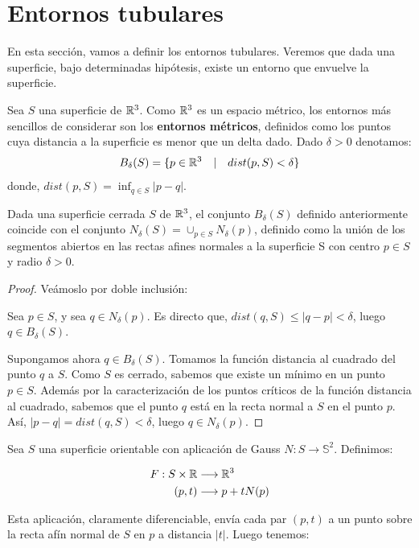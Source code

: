 \section{Entornos tubulares}

En esta sección, vamos a definir los entornos tubulares. Veremos que dada una superficie, bajo determinadas hipótesis, existe un entorno que envuelve la superficie.

Sea $S$ una superficie de $\mathbb{R}^3$. Como $\mathbb{R}^3$ es un espacio métrico, los entornos más sencillos de considerar son los \textbf{entornos métricos}, definidos como los puntos cuya distancia a la superficie es menor que un delta dado. Dado $\delta>0$ denotamos:
%
\begin{equation*}
    B_\delta(S)=\{p\in \mathbb{R}^3 \quad | \quad dist(p,S) < \delta\}
\end{equation*}
%
donde, $dist(p,S) = \displaystyle\inf_{q\in S}|p-q|$.

\begin{lemma}
Dada una superficie cerrada $S$ de $\mathbb{R}^3$, el conjunto $B_\delta(S)$ definido anteriormente coincide con el conjunto $N_\delta(S)=\displaystyle\cup_{p\in S}N_\delta(p)$, definido como la unión de los segmentos abiertos en las rectas afines normales a la superficie S con centro $p \in S$ y radio $\delta > 0$.
\end{lemma}
\begin{proof}
Veámoslo por doble inclusión:

Sea $p \in S$, y sea $q \in N_\delta(p)$. Es directo que, $dist(q,S) \leq |q-p| < \delta$, luego $q \in B_\delta(S)$.

Supongamos ahora $q \in B_\delta(S)$. Tomamos la función distancia al cuadrado del punto $q$ a $S$. Como $S$ es cerrado, sabemos que existe un mínimo en un punto $p \in S$. Además por la caracterización de los puntos críticos de la función distancia al cuadrado, sabemos que el punto $q$ está en la recta normal a $S$ en el punto $p$. Así, $|p-q| = dist(q,S) < \delta$, luego $q \in N_\delta(p)$.
\end{proof}

Sea $S$ una superficie orientable con aplicación de Gauss $N: S \longrightarrow \mathbb{S}^2$. Definimos:

\begin{align*}
    F: S \times \mathbb{R} &\longrightarrow \mathbb{R}^3 \\
    (p,t) &\longrightarrow p + tN(p)
\end{align*}

Esta aplicación, claramente diferenciable, envía cada par $(p,t)$ a un punto sobre la recta afín normal de $S$ en $p$ a distancia $|t|$. Luego tenemos:

